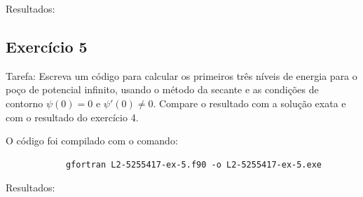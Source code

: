 \documentclass[12pt, a4paper]{article} %
\begin{document}
        Resultados:

    

    \subsection{Exerc\'icio 5}

        Tarefa: Escreva um c\'odigo para calcular os primeiros tr\^es n\'iveis de energia para o po\c{c}o de potencial inﬁnito, usando o m\'etodo da secante e as condi\c{c}\~oes de contorno $\psi(0) = 0$ e
        $\psi '(0) \neq  0$. Compare o resultado com a solu\c{c}\~ao exata e com o resultado do exerc\'icio 4.


        O c\'odigo foi compilado com o comando:
        \begin{verbatim}
            gfortran L2-5255417-ex-5.f90 -o L2-5255417-ex-5.exe
        \end{verbatim}

        Resultados:
        
\end{document}
